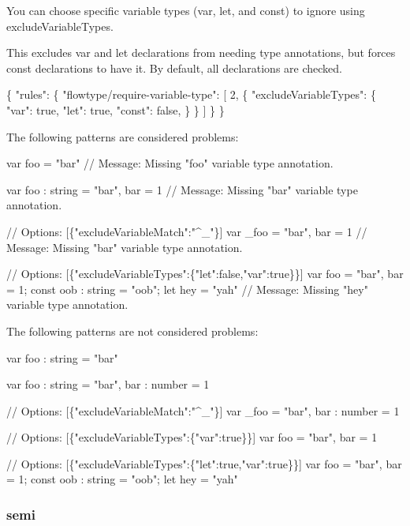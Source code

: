 You can choose specific variable types ({\ttfamily var}, {\ttfamily let}, and {\ttfamily const}) to ignore using {\ttfamily exclude\+Variable\+Types}.

This excludes {\ttfamily var} and {\ttfamily let} declarations from needing type annotations, but forces {\ttfamily const} declarations to have it. By default, all declarations are checked.


\begin{DoxyCode}
\{
    "rules": \{
        "flowtype/require-variable-type": [
            2,
            \{
              "excludeVariableTypes": \{
                "var": true,
                "let": true,
                "const": false,
              \}
            \}
        ]
    \}
\}
\end{DoxyCode}


The following patterns are considered problems\+:


\begin{DoxyCode}
var foo = "bar"
// Message: Missing "foo" variable type annotation.

var foo : string = "bar", bar = 1
// Message: Missing "bar" variable type annotation.

// Options: [\{"excludeVariableMatch":"^\_"\}]
var \_foo = "bar", bar = 1
// Message: Missing "bar" variable type annotation.

// Options: [\{"excludeVariableTypes":\{"let":false,"var":true\}\}]
var foo = "bar", bar = 1; const oob : string = "oob"; let hey = "yah"
// Message: Missing "hey" variable type annotation.
\end{DoxyCode}


The following patterns are not considered problems\+:


\begin{DoxyCode}
var foo : string = "bar"

var foo : string = "bar", bar : number = 1

// Options: [\{"excludeVariableMatch":"^\_"\}]
var \_foo = "bar", bar : number = 1

// Options: [\{"excludeVariableTypes":\{"var":true\}\}]
var foo = "bar", bar = 1

// Options: [\{"excludeVariableTypes":\{"let":true,"var":true\}\}]
var foo = "bar", bar = 1; const oob : string = "oob"; let hey = "yah"
\end{DoxyCode}


\label{_eslint-plugin-flowtype-rules-semi}%
 \subsubsection*{{\ttfamily semi}}

